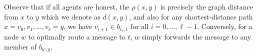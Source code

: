 \documentclass[reprint]{revtex4-1}
\begin{document}
Observe that if all agents are honest, the $\rho(x,y)$ is precisely the graph distance from $x$ to $y$ which we denote as $d(x,y)$, and also for any shortest-distance path $x= v_0, v_1, \ldots, v_{\ell} =  y$, we have $v_{i+1} \in b_{v_i,t}$ for all $i=0, \ldots, \ell-1$. Conversely, for a node $w$ to optimally route a message to $t$, $w$ simply forwards the message to any member of $b_{w,y}$.

%
%
%
%

\end{document}
